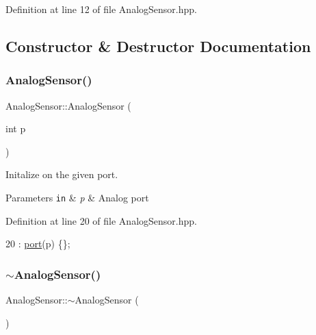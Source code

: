 Definition at line 12 of file Analog\+Sensor.\+hpp.



\subsection{Constructor \& Destructor Documentation}
\mbox{\label{class_analog_sensor_a89c27a846f86896780cf1a9769f4c8b7}} 
\subsubsection{\texorpdfstring{Analog\+Sensor()}{AnalogSensor()}}
{\footnotesize\ttfamily Analog\+Sensor\+::\+Analog\+Sensor (\begin{DoxyParamCaption}\item[{int}]{p }\end{DoxyParamCaption})\hspace{0.3cm}{\ttfamily [inline]}}



Initalize on the given port. 


\begin{DoxyParams}[1]{Parameters}
\mbox{\tt in}  & {\em p} & Analog port \\
\hline
\end{DoxyParams}


Definition at line 20 of file Analog\+Sensor.\+hpp.


\begin{DoxyCode}
20 : \hyperlink{class_analog_sensor_a4897b9d41db1368ecc600a43547580f7}{port}(p) \{\};
\end{DoxyCode}
\mbox{\label{class_analog_sensor_a4b88bf9ee03c180dedea7822e5d32997}} 
\subsubsection{\texorpdfstring{$\sim$\+Analog\+Sensor()}{~AnalogSensor()}}
{\footnotesize\ttfamily Analog\+Sensor\+::$\sim$\+Analog\+Sensor (\begin{DoxyParamCaption}{ }\end{DoxyParamCaption})\hspace{0.3cm}{\ttfamily [inline]}}



